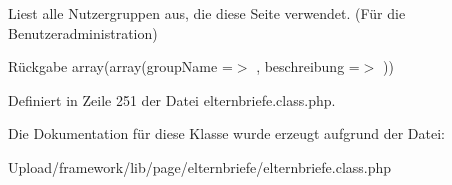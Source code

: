 Liest alle Nutzergruppen aus, die diese Seite verwendet. (Für die Benutzeradministration) \begin{DoxyReturn}{Rückgabe}
array(array(\textquotesingle{}group\+Name\textquotesingle{} =$>$ \textquotesingle{}\textquotesingle{}, \textquotesingle{}beschreibung\textquotesingle{} =$>$ \textquotesingle{}\textquotesingle{})) 
\end{DoxyReturn}


Definiert in Zeile 251 der Datei elternbriefe.\+class.\+php.



Die Dokumentation für diese Klasse wurde erzeugt aufgrund der Datei\+:\begin{DoxyCompactItemize}
\item 
Upload/framework/lib/page/elternbriefe/elternbriefe.\+class.\+php\end{DoxyCompactItemize}
